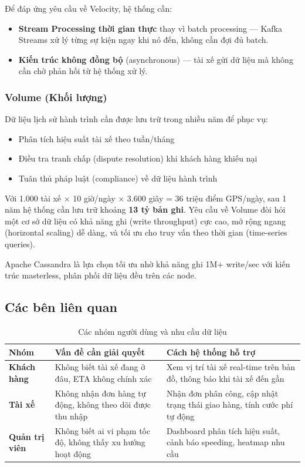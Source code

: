 Để đáp ứng yêu cầu về Velocity, hệ thống cần:
\begin{itemize}
    \item \textbf{Stream Processing thời gian thực} thay vì batch processing — Kafka Streams xử lý từng sự kiện ngay khi nó đến, không cần đợi đủ batch.
    \item \textbf{Kiến trúc không đồng bộ} (asynchronous) — tài xế gửi dữ liệu mà không cần chờ phản hồi từ hệ thống xử lý.
\end{itemize}

\subsubsection{Volume (Khối lượng)}
Dữ liệu lịch sử hành trình cần được lưu trữ trong nhiều năm để phục vụ:
\begin{itemize}
    \item Phân tích hiệu suất tài xế theo tuần/tháng
    \item Điều tra tranh chấp (dispute resolution) khi khách hàng khiếu nại
    \item Tuân thủ pháp luật (compliance) về dữ liệu hành trình
\end{itemize}
Với 1.000 tài xế × 10 giờ/ngày × 3.600 giây = 36 triệu điểm GPS/ngày, sau 1 năm hệ thống cần lưu trữ khoảng \textbf{13 tỷ bản ghi}. Yêu cầu về Volume đòi hỏi một cơ sở dữ liệu có khả năng ghi (write throughput) cực cao, mở rộng ngang (horizontal scaling) dễ dàng, và tối ưu cho truy vấn theo thời gian (time-series queries).

Apache Cassandra là lựa chọn tối ưu nhờ khả năng ghi 1M+ write/sec với kiến trúc masterless, phân phối dữ liệu đều trên các node.

\subsection{Các bên liên quan}
\label{sec:stakeholders}

\begin{table}[H]
\centering
\caption{Các nhóm người dùng và nhu cầu dữ liệu}
\label{tab:stakeholders}
\begin{tabular}{|p{3cm}|p{5cm}|p{5cm}|}
\hline
\textbf{Nhóm} & \textbf{Vấn đề cần giải quyết} & \textbf{Cách hệ thống hỗ trợ} \\
\hline
\textbf{Khách hàng} & Không biết tài xế đang ở đâu, ETA không chính xác & Xem vị trí tài xế real-time trên bản đồ, thông báo khi tài xế đến gần \\
\hline
\textbf{Tài xế} & Không nhận đơn hàng tự động, không theo dõi được thu nhập & Nhận đơn phân công, cập nhật trạng thái giao hàng, tính cước phí tự động \\
\hline
\textbf{Quản trị viên} & Không biết ai vi phạm tốc độ, không thấy xu hướng hoạt động & Dashboard phân tích hiệu suất, cảnh báo speeding, heatmap nhu cầu \\
\hline
\end{tabular}
\end{table}

